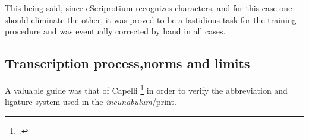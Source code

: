 \documentclass[12pt]{article}
\begin{document}
This being said, since eScriprotium recognizes characters, and for this case one should eliminate the other, it was proved to be a fastidious task for the training procedure and was eventually corrected by hand in all cases.


\subsection{Transcription process,norms and limits}
A valuable guide was that of Capelli \footcite{cappelli1982elements} in order to verify the abbreviation and ligature system used in the \textit{incunabulum}/print.\\

\begin{landscape}

\pagestyle{empty}

\newcommand{\rum}{\char"A75D\xspace}
\newcommand{\pro}{\char"A753\xspace}
\newcommand{\per}{\char"A751\xspace}
\newcommand{\eced}{\char"0119\xspace}
\newcommand{\quod}{\char"A759\xspace}
\newcommand{\Quod}{\char"A756\xspace}
\newcommand{\ussup}{\char"1DD2\xspace}
\newcommand{\pre}{\char"A751\xspace}
\newcommand{\macron}{\char"0303\xspace}
\newcommand{\ursup}{\char"1DD1\xspace}
\newcommand{\opena}{\char"1DD3\xspace}
\newcommand{\qu}{\char"A757\xspace}
\newcommand{\isup}{\char"0365\xspace}
\newcommand{\etc}{.2c\opena{}.\xspace}
\newcommand{\sm}{\char"1E9C{}m\xspace}



\end{landscape}
\end{document}
